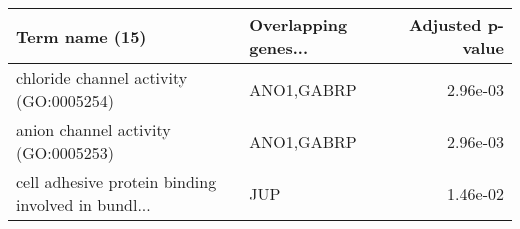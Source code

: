 \begin{tabular}{llr}
\toprule
                                    Term name (15) & Overlapping genes... &  Adjusted p-value \\
\midrule
            chloride channel activity (GO:0005254) &           ANO1,GABRP &          2.96e-03 \\
               anion channel activity (GO:0005253) &           ANO1,GABRP &          2.96e-03 \\
cell adhesive protein binding involved in bundl... &                  JUP &          1.46e-02 \\
\bottomrule
\end{tabular}
